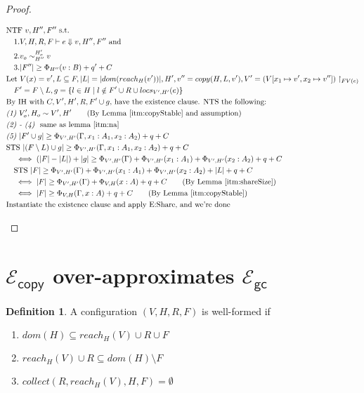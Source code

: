 \documentclass{easychair}
\newcommand{\ms}[1]{\ensuremath{\mathsf{#1}}}
\newcommand{\veq}[4]{#3 \sim^{#1}_{#2} #4}
\newcommand{\gcSem}{\ensuremath{\mathcal{E}_{\ms{gc}}}}
\newcommand{\copySem}{\ensuremath{\mathcal{E}_{\ms{copy}}}}
\theoremstyle{definition}
\newtheorem{definition}{Definition}
\begin{document}
\begin{proof}
\begin{description}
\begin{align*}
  &\text{NTF } v,H'',F'' \text{ s.t. }\\
	&\quad 1. V,H,R,F \vdash e \Downarrow v, H'',F'' \text{ and }\\ 
		&\quad 2. \veq{H_o'}{H''}{v_o}{v}\\
  &\quad 3. |F''| \ge \Phi_{H''}(v:B) + q' + C\\
		&\text{Let } V(x) = v',
  L \subseteq F,
  |L| = |dom(reach_H(v'))|,
  H',v'' = copy(H,L,v'),
	V' = (V[x_1 \mapsto v',x_2 \mapsto v'']) \restriction_{FV(e)}\\
		&\quad F' =	F \setminus L,
		g = \{l \in H \mid l \notin F' \cup R \cup locs_{V',H'}(e)\}\\
		&\text{By IH with } C, V',H',R,F'\cup g \text{, have the existence clause. NTS the following: }\\
		&\emph{(1) } V_o',H_o \sim V',H' \tag{By Lemma~\ref{itm:copyStable} and assumption}\\
		&\emph{(2) - (4) } \text{ same as lemma~\ref{itm:na}}\\ 
		&\emph{(5) } |F' \cup g| \ge \Phi_{V',H'}(\Gamma,x_1 : A_1,x_2 : A_2) + q + C\\
		&\text{STS } |(F\setminus L) \cup g| \ge \Phi_{V', H'}(\Gamma,x_1 : A_1,x_2 : A_2) + q + C\\
		&\quad \iff (|F| - |L|) + |g| \ge \Phi_{V',H'}(\Gamma) + 
			\Phi_{V',H'}(x_1 : A_1) + \Phi_{V',H'}(x_2 : A_2) + q + C\\
		&\quad \text{STS } |F| \ge \Phi_{V',H'}(\Gamma) + 
			\Phi_{V',H'}(x_1 : A_1) + \Phi_{V',H'}(x_2 : A_2) + |L| + q + C\\
	&\quad \iff |F| \ge \Phi_{V',H'}(\Gamma) + 
			\Phi_{V,H}(x : A) + q + C \tag{By Lemma~\ref{itm:shareSize}}\\
		&\quad \iff |F| \ge \Phi_{V,H}(\Gamma,x:A) + q + C \tag{By Lemma~\ref{itm:copyStable}}\\
		&\text{Instantiate the existence clause and apply E:Share, and we're done}
	\end{align*}
  \end{description}
\end{proof}

\section{\copySem{} over-approximates \gcSem{}}

\begin{definition} A configuration $(V,H,R,F)$ is well-formed if 
	\begin{enumerate}
		\item $dom(H) \subseteq reach_H(V) \cup R \cup F$
		\item $reach_H(V) \cup R \subseteq dom(H) \setminus F$
		\item $collect(R,reach_H(V),H,F) = \emptyset$
	\end{enumerate}
\end{definition}
\end{document}
